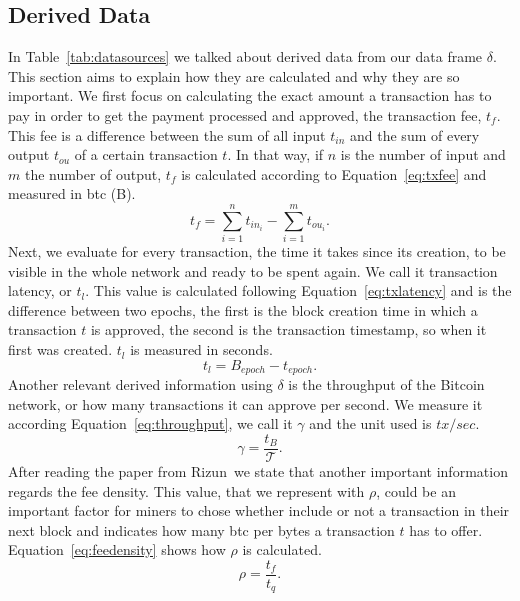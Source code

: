\documentclass[USenglish]{uit-thesis}
\def\bitcoin{\leavevmode\rlap{\hskip.5pt-}B}
\begin{document}
\subsection{Derived Data}
In Table~\ref{tab:datasources} we talked about derived data from
our data frame $\delta$. This section aims to explain how they are
calculated and why they are so important. We first focus on
calculating the exact amount a transaction has to pay in order to
get the payment processed and approved, the transaction fee,
$t_f$. This fee is a difference between the sum of all
input $t_{in}$ and the sum of every output $t_{ou}$ of a certain transaction $t$.
In that way, if $n$ is the number of input and $m$ the number of output,
$t_f$ is calculated according to Equation~\ref{eq:txfee} and measured
in \gls{btc} (\bitcoin).
\begin{equation}
\label{eq:txfee}
t_f = \sum_{i = 1}^{n}t_{in_i} - \sum_{i = 1}^{m} t_{ou_i}.
\end{equation}
Next, we evaluate for every transaction, the time it takes since its
creation, to be visible in the whole network and ready to be spent again.
We call it transaction latency, or $t_l$. This value is calculated following
Equation~\ref{eq:txlatency} and is the difference between two epochs,
the first is the block creation time in which
a transaction $t$ is approved, the second is the transaction
timestamp, so when it first was created. $t_l$ is measured in
seconds.
\begin{equation}
\label{eq:txlatency}
t_l = B_{epoch} - t_{epoch}.
\end{equation}
Another relevant derived information using $\delta$ is the throughput
of the Bitcoin network, or how many transactions it can approve
per second. We measure it according Equation~\ref{eq:throughput},
we call it $\gamma$ and the unit used is $tx/sec$.
\begin{equation}
\label{eq:throughput}
\gamma = \frac{t_B}{\mathcal{T}}.
\end{equation}
After reading the paper from Rizun\,\cite{Rizun:2015:blocksizelimit}
we state that another important information regards the
fee density. This value, that we represent with
$\rho$, could be an important factor for miners
to chose whether include or not a transaction in their
next block and indicates how many \gls{btc} per bytes
a transaction $t$ has to offer. Equation~\ref{eq:feedensity}
shows how $\rho$ is calculated.
\begin{equation}
\label{eq:feedensity}
\rho = \frac{t_f}{t_q}.
\end{equation} 
\end{document}

